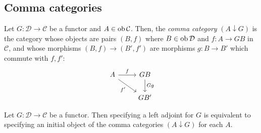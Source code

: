 \subsection{Comma categories}
\begin{definition}
    Let \( G : \mathcal D \to \mathcal C \) be a functor and \( A \in \operatorname{ob} \mathcal C \).
    Then, the \emph{comma category} \( (A \downarrow G) \) is the category whose objects are pairs \( (B, f) \) where \( B \in \operatorname{ob} \mathcal D \) and \( f : A \to GB \) in \( \mathcal C \), and whose morphisms \( (B, f) \to (B', f') \) are morphisms \( g : B \to B' \) which commute with \( f, f' \):
\[\begin{tikzcd}
	A & GB \\
	& {GB'}
	\arrow["f", from=1-1, to=1-2]
	\arrow["Gg", from=1-2, to=2-2]
	\arrow["{f'}"', from=1-1, to=2-2]
\end{tikzcd}\]
\end{definition}
\begin{theorem}
    Let \( G : \mathcal D \to \mathcal C \) be a functor.
    Then specifying a left adjoint for \( G \) is equivalent to specifying an initial object of the comma categories \( (A \downarrow G) \) for each \( A \).
\end{theorem}
